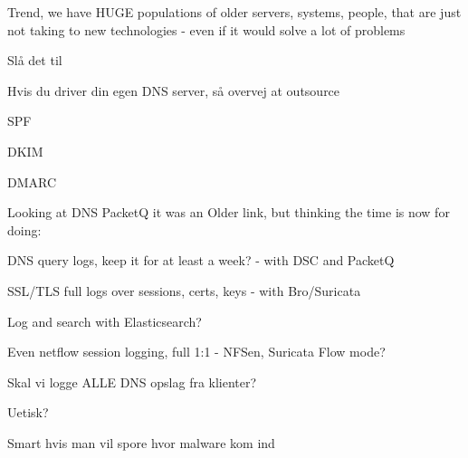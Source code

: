\documentclass[Screen16to9,17pt]{foils}
\begin{document}
Trend, we have HUGE populations of older servers, systems, people,
that are just not taking to new technologies - even if it would solve a lot of problems




\begin{list2}
\item Slå det til
\item Hvis du driver din egen DNS server, så overvej at outsource
\end{list2}



\begin{list2}
\item SPF
\item DKIM
\item DMARC
\end{list2}




Looking at DNS PacketQ it was an Older link, but thinking the time is now for doing:

\begin{list2}
\item DNS query logs, keep it for at least a week? - with DSC and PacketQ 

\item SSL/TLS full logs over sessions, certs, keys - with Bro/Suricata\\
\item Log and search with Elasticsearch?\\
\item Even netflow session logging, full 1:1 - NFSen, Suricata Flow mode?
\end{list2}




Skal vi logge ALLE DNS opslag fra klienter?

\begin{list2}
\item Uetisk?
\item Smart hvis man vil spore hvor malware kom ind
\end{list2}
\end{document}
